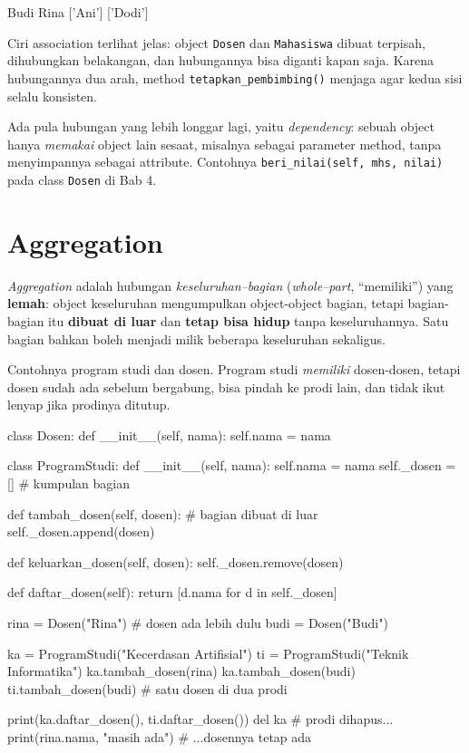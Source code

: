 \begin{keluaran}
Budi Rina
['Ani']
['Dodi']
\end{keluaran}

Ciri association terlihat jelas: object \texttt{Dosen} dan \texttt{Mahasiswa} dibuat terpisah, dihubungkan belakangan, dan hubungannya bisa diganti kapan saja. Karena hubungannya dua arah, method \texttt{tetapkan\_pembimbing()} menjaga agar kedua sisi selalu konsisten.

\begin{info}
Ada pula hubungan yang lebih longgar lagi, yaitu \emph{dependency}: sebuah object hanya \emph{memakai} object lain sesaat, misalnya sebagai parameter method, tanpa menyimpannya sebagai attribute. Contohnya \texttt{beri\_nilai(self, mhs, nilai)} pada class \texttt{Dosen} di Bab 4.
\end{info}

\section{Aggregation}

\emph{Aggregation} adalah hubungan \emph{keseluruhan--bagian} (\emph{whole--part}, ``memiliki'') yang \textbf{lemah}: object keseluruhan mengumpulkan object-object bagian, tetapi bagian-bagian itu \textbf{dibuat di luar} dan \textbf{tetap bisa hidup} tanpa keseluruhannya. Satu bagian bahkan boleh menjadi milik beberapa keseluruhan sekaligus.

Contohnya program studi dan dosen. Program studi \emph{memiliki} dosen-dosen, tetapi dosen sudah ada sebelum bergabung, bisa pindah ke prodi lain, dan tidak ikut lenyap jika prodinya ditutup.

\begin{kode}[Aggregation]
class Dosen:
    def __init__(self, nama):
        self.nama = nama

class ProgramStudi:
    def __init__(self, nama):
        self.nama = nama
        self._dosen = []                      # kumpulan bagian

    def tambah_dosen(self, dosen):            # bagian dibuat di luar
        self._dosen.append(dosen)

    def keluarkan_dosen(self, dosen):
        self._dosen.remove(dosen)

    def daftar_dosen(self):
        return [d.nama for d in self._dosen]

rina = Dosen("Rina")                          # dosen ada lebih dulu
budi = Dosen("Budi")

ka = ProgramStudi("Kecerdasan Artifisial")
ti = ProgramStudi("Teknik Informatika")
ka.tambah_dosen(rina)
ka.tambah_dosen(budi)
ti.tambah_dosen(budi)                         # satu dosen di dua prodi

print(ka.daftar_dosen(), ti.daftar_dosen())
del ka                                        # prodi dihapus...
print(rina.nama, "masih ada")                 # ...dosennya tetap ada
\end{kode}

